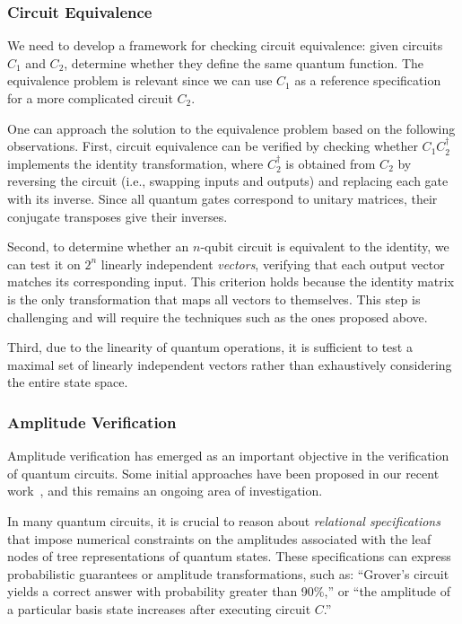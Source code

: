 \subsubsection{Circuit Equivalence}
\label{equivalence:task}
We need to develop a framework for checking circuit equivalence: given circuits $C_1$ and $C_2$, determine whether they define the same quantum function.
%
The equivalence problem is relevant since we can use $C_1$ as a reference specification for a more complicated circuit $C_2$.
%

One can approach the solution to the equivalence problem based on the following observations.
%
First, circuit equivalence can be verified by checking whether $C_1C_2^\dag$ implements the identity transformation, where $C_2^\dag$ is obtained from $C_2$ by reversing the circuit (i.e., swapping inputs and outputs) and replacing each gate with its inverse.
%
Since all quantum gates correspond to unitary matrices, their conjugate transposes give their inverses.
%

Second, to determine whether an $n$-qubit circuit is equivalent to the identity, we can test it on $2^n$ linearly independent \emph{vectors}, verifying that each output vector matches its corresponding input.
%
This criterion holds because the identity matrix is the only transformation that maps all vectors to themselves.
%
This step is challenging and will require the techniques such as the ones proposed above.
%

Third, due to the linearity of quantum operations, it is sufficient to test a maximal set of linearly independent vectors rather than exhaustively considering the entire state space.
%

\subsubsection{Amplitude Verification}

Amplitude verification has emerged as an important objective in the verification of quantum circuits. Some initial approaches have been proposed in our recent work~\citep{ChenCLLT23,chen2025autoq,DBLP:journals/pacmpl/AbdullaCCHLLLT25}, and this remains an ongoing area of investigation.

In many quantum circuits, it is crucial to reason about \emph{relational specifications} that impose numerical constraints on the amplitudes associated with the leaf nodes of tree representations of quantum states. These specifications can express probabilistic guarantees or amplitude transformations, such as: ``Grover’s circuit yields a correct answer with probability greater than 90\%,'' or ``the amplitude of a particular basis state increases after executing circuit $C$.''

